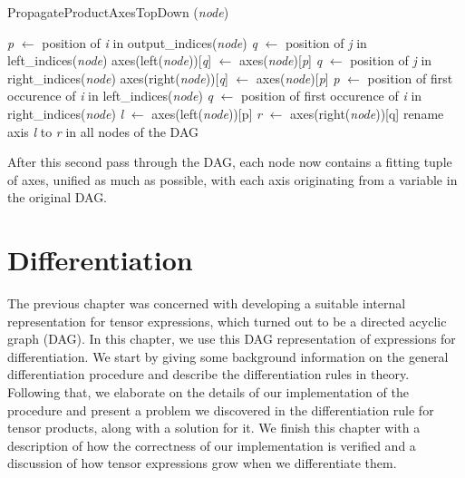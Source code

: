 \documentclass[12pt, a4paper]{report}
\begin{document}
\begin{algorithm}[ht!]
    \caption[Top-Down Axis Propagation in Product Node]{PropagateProductAxesTopDown (\textit{node})}
    \label{alg:product_axes_2}
    \begin{algorithmic}
            \State \textit{p} $\gets$ position of \textit{i} in output\_indices(\textit{node})
                \State \textit{q} $\gets$ position of \textit{j} in left\_indices(\textit{node})
                    \State axes(left(\textit{node}))[\textit{q}] $\gets$ axes(\textit{node})[\textit{p}]
                \EndIf
            \EndFor
                \State \textit{q} $\gets$ position of \textit{j} in right\_indices(\textit{node})
                    \State axes(right(\textit{node}))[\textit{q}] $\gets$ axes(\textit{node})[\textit{p}]
                \EndIf
            \EndFor
        \EndFor
         
            \State \textit{p} $\gets$ position of first occurence of \textit{i} in left\_indices(\textit{node})
                \State \textit{q} $\gets$ position of first occurence of \textit{i} in right\_indices(\textit{node})
                \State \textit{l} $\gets$ axes(left(\textit{node}))[p]
                \State \textit{r} $\gets$ axes(right(\textit{node}))[q]
                \State rename axis \textit{l} to \textit{r} in all nodes of the DAG
            \EndIf
        \EndFor
    \end{algorithmic}
\end{algorithm}

After this second pass through the DAG, each node now contains a fitting tuple of axes, unified as much as possible, with each axis originating from a variable in the original DAG.

\FloatBarrier
\chapter{Differentiation}
The previous chapter was concerned with developing a suitable internal representation for tensor expressions, which turned out to be a directed acyclic graph (DAG).
In this chapter, we use this DAG representation of expressions for differentiation.
We start by giving some background information on the general differentiation procedure and describe the differentiation rules in theory.
Following that, we elaborate on the details of our implementation of the procedure and present a problem we discovered in the differentiation rule for tensor products, along with a solution for it.
We finish this chapter with a description of how the correctness of our implementation is verified and a discussion of how tensor expressions grow when we differentiate them.
\end{document}
